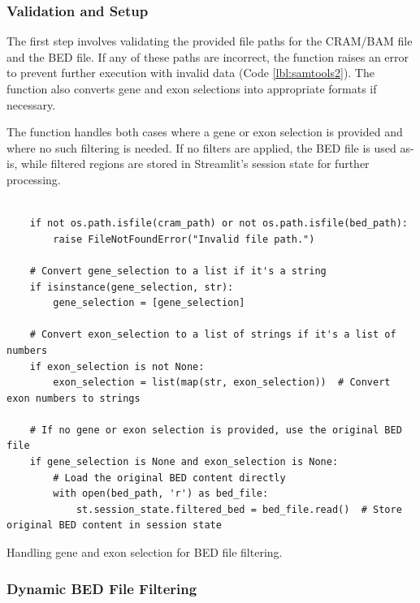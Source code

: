 \subsubsection{\textbf{Validation and Setup}}

The first step involves validating the provided file paths for the CRAM/BAM file and the BED file. If any of these paths are incorrect, the function raises an error to prevent further execution with invalid data (Code \ref{lbl:samtools2}). The function also converts gene and exon selections into appropriate formats if necessary.

The function handles both cases where a gene or exon selection is provided and where no such filtering is needed. If no filters are applied, the BED file is used as-is, while filtered regions are stored in Streamlit's session state for further processing.

\begin{longlisting}
\begin{verbatim}

    if not os.path.isfile(cram_path) or not os.path.isfile(bed_path):
        raise FileNotFoundError("Invalid file path.")

    # Convert gene_selection to a list if it's a string
    if isinstance(gene_selection, str):
        gene_selection = [gene_selection]

    # Convert exon_selection to a list of strings if it's a list of numbers
    if exon_selection is not None:
        exon_selection = list(map(str, exon_selection))  # Convert exon numbers to strings

    # If no gene or exon selection is provided, use the original BED file
    if gene_selection is None and exon_selection is None:
        # Load the original BED content directly
        with open(bed_path, 'r') as bed_file:
            st.session_state.filtered_bed = bed_file.read()  # Store original BED content in session state
\end{verbatim}
\caption{Handling gene and exon selection for BED file filtering.}
\label{lbl:samtools2}
\end{longlisting}

\subsubsection{\textbf{Dynamic BED File Filtering}}


